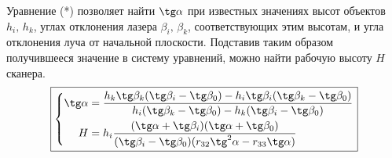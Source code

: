 \documentclass[a4paper, 12pt]{article}
\begin{document}
    Уравнение (*) позволяет найти $\tg\alpha$ при известных значениях высот объектов $h_i,\,h_k$, углах отклонения лазера $\beta_i,\,\beta_k$, соответствующих этим высотам, и угла отклонения луча от начальной плоскости. Подставив таким образом получившееся значение в систему уравнений, можно найти рабочую высоту $H$ сканера.
    \begin{equation*}
        \boxed{
            \left\{
            \begin{aligned}
                \tg\alpha &= \frac{h_k\tg\beta_k(\tg\beta_i-\tg\beta_0) - h_i\tg\beta_i(\tg\beta_k-\tg\beta_0)}{h_i(\tg\beta_k-\tg\beta_0) - h_k(\tg\beta_i-\tg\beta_0)}\\
                H &= h_i\frac{(\tg\alpha + \tg\beta_i)(\tg\alpha + \tg\beta_0)}{(\tg\beta_i - \tg\beta_0)(r_{32}\tg^2\alpha-r_{33}\tg\alpha)}
            \end{aligned}
            \right.
        }
    \end{equation*}
\end{document}
